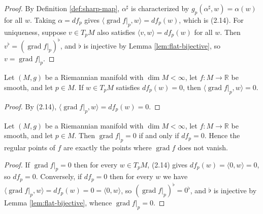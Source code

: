 \begin{proof}
\leanok
{}
By Definition \ref{def:sharp-map}, $\alpha^\sharp$ is characterized by $g_p(\alpha^\sharp, w) = \alpha(w)$ for all $w$. Taking $\alpha = df_p$ gives $\langle \operatorname{grad} f|_p, w\rangle = df_p(w)$, which is (2.14). For uniqueness, suppose $v \in T_p M$ also satisfies $\langle v, w\rangle = df_p(w)$ for all $w$. Then $v^\flat = (\operatorname{grad} f|_p)^\flat$, and $\flat$ is injective by Lemma \ref{lem:flat-bijective}, so $v = \operatorname{grad} f|_p$.
\end{proof}

\begin{lemma}
\label{lem:gradient-orthogonal-kernel}
\leanok
{}
Let $(M,g)$ be a Riemannian manifold with $\dim M < \infty$, let $f : M \to \mathbb{R}$ be smooth, and let $p \in M$. If $w \in T_p M$ satisfies $df_p(w) = 0$, then $\langle \operatorname{grad} f|_p, w \rangle = 0$.
\end{lemma}

\begin{proof}
\leanok
{}
By (2.14), $\langle \operatorname{grad} f|_p, w\rangle = df_p(w) = 0$.
\end{proof}

\begin{lemma}
\label{lem:gradient-eq-zero-iff}
\leanok
{}
Let $(M,g)$ be a Riemannian manifold with $\dim M < \infty$, let $f : M \to \mathbb{R}$ be smooth, and let $p \in M$. Then $\operatorname{grad} f|_p = 0$ if and only if $df_p = 0$. Hence the regular points of $f$ are exactly the points where $\operatorname{grad} f$ does not vanish.
\end{lemma}

\begin{proof}
\leanok
{}
If $\operatorname{grad} f|_p = 0$ then for every $w \in T_p M$, (2.14) gives $df_p(w) = \langle 0, w\rangle = 0$, so $df_p = 0$. Conversely, if $df_p = 0$ then for every $w$ we have $\langle \operatorname{grad} f|_p, w\rangle = df_p(w) = 0 = \langle 0, w \rangle$, so $(\operatorname{grad} f|_p)^\flat = 0^\flat$, and $\flat$ is injective by Lemma \ref{lem:flat-bijective}, whence $\operatorname{grad} f|_p = 0$.
\end{proof}


